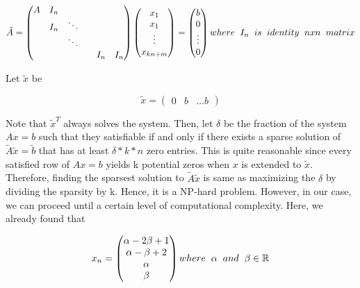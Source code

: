 \documentclass[12pt]{amsart}
\begin{document}
\begin{equation}
  \tilde{A} = 
\begin{pmatrix}
A & I_{n} &  &  & &\\
 & I_{n} & \ddots &  & &\\
 &  & \ddots &  & &\\
 &  &  &  & I_{n} & I_{n} 
\end{pmatrix}
\begin{pmatrix}
x_1 \\
x_1 \\
\vdots \\
x_{kn+m}
\end{pmatrix} = 
\begin{pmatrix}
b\\
0 \\
\vdots \\
0
\end{pmatrix} where \hspace{2mm}I_n \hspace{2mm}is \hspace{2mm}identity\hspace{2mm} n x n  \hspace{2mm}matrix  
\end{equation}

Let $\tilde{x}$ be 

\begin{equation}
  \tilde{x} = \begin{pmatrix}
0 & b & \hdots b
\end{pmatrix}  
\end{equation}


Note that $\tilde{x}^T$ always solves the system. Then, let $\delta$ be the fraction of the system $ Ax = b$  such that they satisfiable if and only if there exists a sparse solution of $\tilde{A}\tilde{x} = \tilde{b}$ that has at least $\delta * k * n$ zero entries. This is quite reasonable since every satisfied row of $Ax = b$ yields k potential zeros when $x$ is extended to $\tilde{x}$. Therefore, finding the sparsest solution to $\tilde{A}\tilde{x}$ is same as maximizing the $\delta$ by dividing the sparsity by k. Hence, it is a NP-hard problem.
However, in our case, we can proceed until a certain level of computational complexity. Here, we already found that 

\[ x_n = 
\begin{pmatrix}
 \alpha - 2\beta + 1\\ 
 \alpha - \beta + 2\\ 
 \alpha \\
 \beta
\end{pmatrix} where \hspace{2mm} \alpha \hspace{2mm} and \hspace{2mm} \beta \in \mathbb{R}
\]
\end{document}
